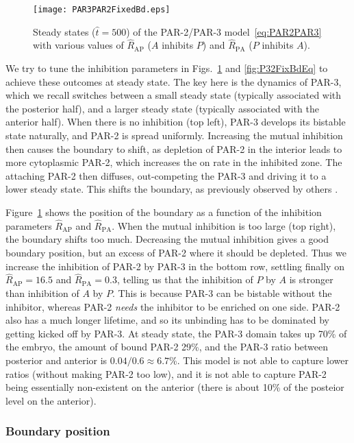 \documentclass[11pt]{article}
\newcommand{\red}[1]{\color{red}#1\normalcolor}
\newcommand{\6}[1]{#1_{\text{6}}}
\newcommand{\3}[1]{#1_{\text{3}}}
\begin{document}
\begin{figure}
\centering
\texttt{[image: PAR3PAR2FixedBd.eps]}
\caption{\label{fig:P32FixBd}Steady states ($\hat t=500$) of the PAR-2/PAR-3 model\ \eqref{eq:PAR2PAR3} with various values of $\hat R_\text{AP}$ ($A$ inhibits $P$) and $\hat R_\text{PA}$ ($P$ inhibits $A$).}
\end{figure}

We try to tune the inhibition parameters in Figs.\ \ref{fig:P32FixBd} and \ref{fig:P32FixBdEq} to achieve these outcomes at steady state. The key here is the dynamics of PAR-3, which we recall switches between a small steady state (typically associated with the posterior half), and a larger steady state (typically associated with the anterior half). When there is no inhibition (top left), PAR-3 develops its bistable state naturally, and PAR-2 is spread uniformly. Increasing the mutual inhibition then causes the boundary to shift, as depletion of PAR-2 in the interior leads to more cytoplasmic PAR-2, which increases the on rate in the inhibited zone. The attaching PAR-2 then diffuses, out-competing the PAR-3 and driving it to a lower steady state. This shifts the boundary, as previously observed by others \cite{goehring2011polarization}. 

Figure\ \ref{fig:P32FixBd} shows the position of the boundary as a function of the inhibition parameters $\hat R_\text{AP}$ and $\hat R_\text{PA}$. When the mutual inhibition is too large (top right), the boundary shifts too much. Decreasing the mutual inhibition gives a good boundary position, but an excess of PAR-2 where it should be depleted. Thus we increase the inhibition of PAR-2 by PAR-3 in the bottom row, settling finally on $\hat R_\text{AP}=16.5$ and $\hat R_\text{PA}=0.3$, telling us that the inhibition of $P$ by $A$ is stronger than inhibition of $A$ by $P$. This is because PAR-3 can be bistable without the inhibitor, whereas PAR-2 \emph{needs} the inhibitor to be enriched on one side. PAR-2 also has a much longer lifetime, and so its unbinding has to be dominated by getting kicked off by PAR-3. At steady state, the PAR-3 domain takes up 70\% of the embryo, the amount of bound PAR-2 29\%, and the PAR-3 ratio between posterior and anterior is $0.04/0.6 \approx 6.7$\%. This model is not able to capture lower ratios (without making PAR-2 too low), and \red{it is not able to capture PAR-2 being essentially non-existent on the anterior (there is about 10\% of the posteior level on the anterior).}

\subsubsection{Boundary position}
\end{document}

